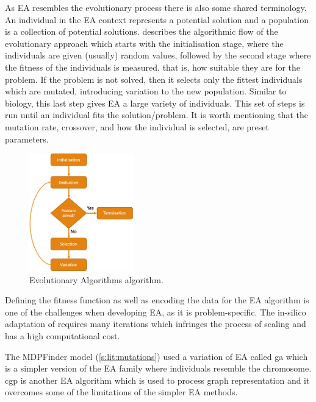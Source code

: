 As EA resembles the evolutionary process there is also some shared terminology. An individual in the EA context represents a potential solution and a population is a collection of potential solutions.  describes the algorithmic flow of the evolutionary approach which starts with the initialisation stage, where the individuals are given (usually) random values, followed by the second stage where the fitness of the individuals is measured, that is, how suitable they are for the problem. If the problem is not solved, then it selects only the fittest individuals which are mutated, introducing variation to the new population. Similar to biology, this last step gives EA a large variety of individuals. This set of steps is run until an individual fits the solution/problem. It is worth mentioning that the mutation rate, crossover, and how the individual is selected, are preset parameters. 

\begin{figure}[!htb]
  \centering\includegraphics[width=0.4\textwidth,height=0.4\textheight,keepaspectratio]{Sections/Lit_review/Resources/EA_basic.png}
    \caption{Evolutionary Algorithms algorithm.}
    \label{fig:ea_basic}
\end{figure}
\FloatBarrier


Defining the fitness function as well as encoding the data for the EA algorithm is one of the challenges when developing EA, as it is problem-specific. The in-silico adaptation of  requires many iterations which infringes the process of scaling and has a high computational cost.

The MDPFinder model (\cref{s:lit:mutations}) used a variation of EA called \acrfull{ga} which is a simpler version of the EA family where individuals resemble the chromosome. \acrfull{cgp} is another EA algorithm which is used to process graph representation and it overcomes some of the limitations of the simpler EA methods. 

